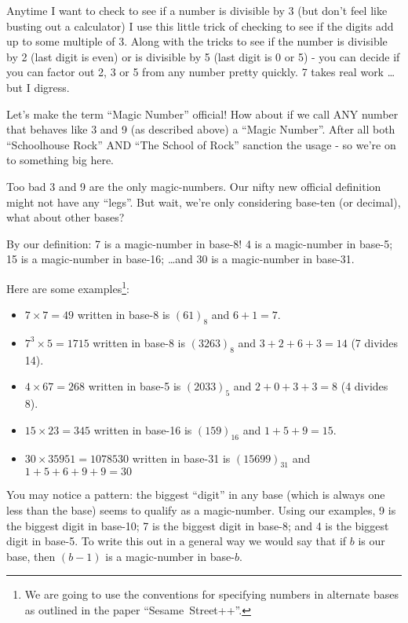 \documentclass{article}
\begin{document}
Anytime I want to check to see if a number is divisible by 3 (but don't feel like busting out a calculator)
I use this little trick of checking to see if the digits add up to some multiple of 3. Along with the tricks to see if the number is divisible by 2 (last digit is even) or is divisible 
by 5 (last digit is 0 or 5) - you can decide if you can factor out 2, 3 or 5 from any number pretty quickly.  7 takes real work \dots{}but I digress.

Let's make the term ``Magic Number'' official!
How about if we call ANY number that behaves like 3 and 9 (as described above) a ``Magic Number''.
After all both ``Schoolhouse Rock'' AND ``The School of Rock'' sanction the usage - so we're on
to something big here.

Too bad 3 and 9 are the only magic-numbers. Our nifty new official definition might not have any ``legs''.
But wait, we're only considering base-ten (or decimal), what about other bases?

By our definition: 7 is a magic-number in base-8!
4 is a magic-number in base-5;
15 is a magic-number in base-16;
\dots{}and 30 is a magic-number in base-31.

Here are some examples\footnote{We are going to use the conventions for specifying
numbers in alternate bases as outlined in the paper ``Sesame~Street++''.}:
\begin{itemize}
\item $7\times{}7=49$ written in base-8 is $(61)_8$ and $6+1=7$.
\item $7^3\times{}5=1715$ written in base-8 is $(3263)_8$ and $3+2+6+3=14$ (7 divides 14).
\item $4\times{}67=268$ written in base-5 is $(2033)_5$ and $2+0+3+3=8$ (4 divides 8).
\item $15\times{}23=345$ written in base-16 is $(159)_{16}$ and $1+5+9=15$.
\item $30\times{}35951=1078530$ written in base-31 is $(15699)_{31}$ and $1+5+6+9+9=30$
\end{itemize}

You may notice a pattern: the biggest ``digit'' in any base (which is always one less than the base) seems to
qualify as a magic-number.
Using our examples, 9 is the biggest
digit in base-10; 7 is the biggest digit in base-8; and 4 is the biggest digit in base-5.  To write this out in a general way
we would say that if $b$ is our base, then $(b-1)$ is a magic-number in base-$b$.
\end{document}
